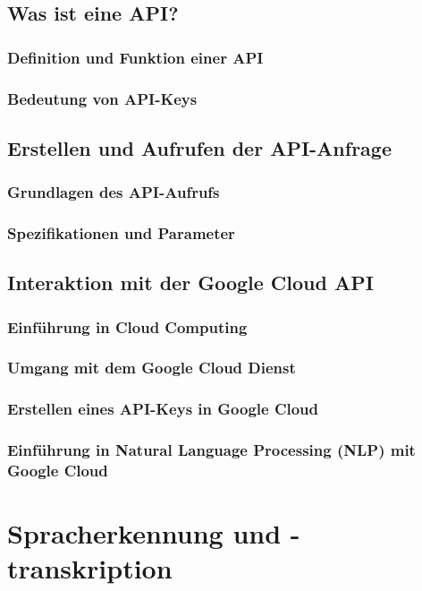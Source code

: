 \documentclass[12pt,a4paper]{article}
\begin{document}
\subsection{Was ist eine API?}
\subsubsection{Definition und Funktion einer API}
\subsubsection{Bedeutung von API-Keys}

\subsection{Erstellen und Aufrufen der API-Anfrage}
\subsubsection{Grundlagen des API-Aufrufs}
\subsubsection{Spezifikationen und Parameter}


\subsection{Interaktion mit der Google Cloud API}
\subsubsection{Einführung in Cloud Computing}
\subsubsection{Umgang mit dem Google Cloud Dienst}
\subsubsection{Erstellen eines API-Keys in Google Cloud}
\subsubsection{Einführung in Natural Language Processing (NLP) mit Google Cloud}




\newpage
\section{Spracherkennung und -transkription}
\end{document}
